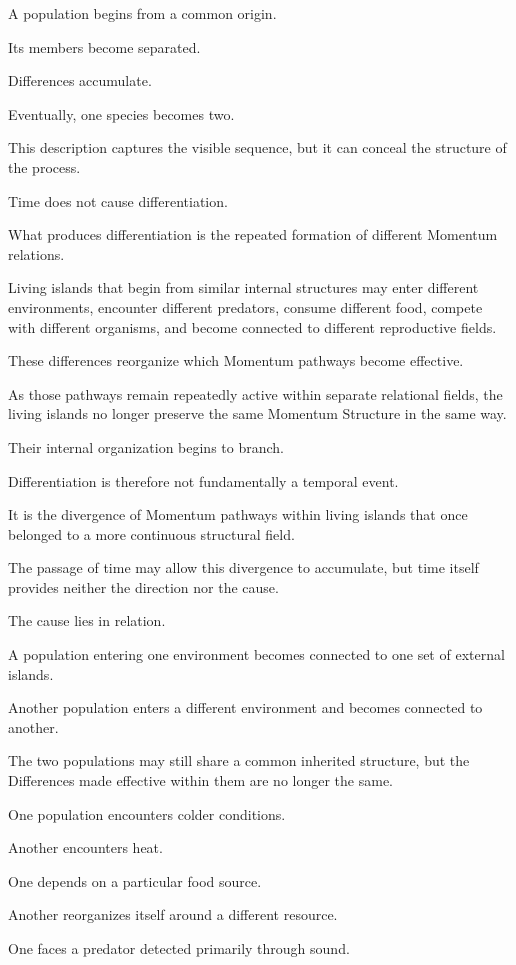 A population begins from a common origin.

Its members become separated.

Differences accumulate.

Eventually, one species becomes two.

This description captures the visible sequence, but it can conceal the structure of the process.

Time does not cause differentiation.

What produces differentiation is the repeated formation of different Momentum relations.

Living islands that begin from similar internal structures may enter different environments, encounter different predators, consume different food, compete with different organisms, and become connected to different reproductive fields.

These differences reorganize which Momentum pathways become effective.

As those pathways remain repeatedly active within separate relational fields, the living islands no longer preserve the same Momentum Structure in the same way.

Their internal organization begins to branch.

Differentiation is therefore not fundamentally a temporal event.

It is the divergence of Momentum pathways within living islands that once belonged to a more continuous structural field.

The passage of time may allow this divergence to accumulate, but time itself provides neither the direction nor the cause.

The cause lies in relation.

A population entering one environment becomes connected to one set of external islands.

Another population enters a different environment and becomes connected to another.

The two populations may still share a common inherited structure, but the Differences made effective within them are no longer the same.

One population encounters colder conditions.

Another encounters heat.

One depends on a particular food source.

Another reorganizes itself around a different resource.

One faces a predator detected primarily through sound.

